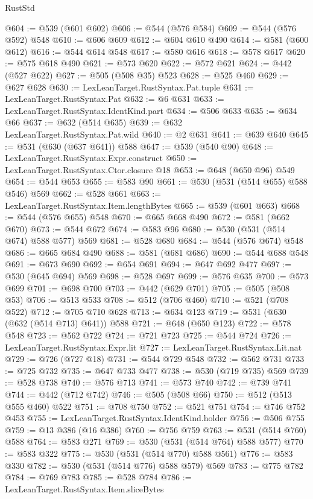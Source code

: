 \begin{lexlean}{RustStd}
\begin{coremodule}
@604 := @539 (@601 @602)
@606 := @544 (@576 @584)
@609 := @544 (@576 @592) @548
@610 := @606 @609
@612 := @604 @610 @490
@614 := @581 (@600 @612)
@616 := @544 @614 @548
@617 := @580 @616
@618 := @578 @617
@620 := @575 @618 @490
@621 := @573 @620
@622 := @572 @621
@624 := @442 (@527 @622)
@627 := @505 (@508 @35) @523
@628 := @525 @460
@629 := @627 @628
@630 := LexLeanTarget.RustSyntax.Pat.tuple
@631 := LexLeanTarget.RustSyntax.Pat
@632 := @6 @631
@633 := LexLeanTarget.RustSyntax.IdentKind.part
@634 := @506 @633
@635 := @634 @66
@637 := @632 (@514 @635)
@639 := @632 LexLeanTarget.RustSyntax.Pat.wild
@640 := @2 @631
@641 := @639 @640
@645 := @531 (@630 (@637 @641)) @588
@647 := @539 (@540 @90)
@648 := LexLeanTarget.RustSyntax.Expr.construct
@650 := LexLeanTarget.RustSyntax.Ctor.closure @18
@653 := @648 (@650 @96) @549
@654 := @544 @653
@655 := @583 @90
@661 := @530 (@531 (@514 @655) @588 @546) @569
@662 := @528 @661
@663 := LexLeanTarget.RustSyntax.Item.lengthBytes
@665 := @539 (@601 @663)
@668 := @544 (@576 @655) @548
@670 := @665 @668 @490
@672 := @581 (@662 @670)
@673 := @544 @672
@674 := @583 @96
@680 := @530 (@531 (@514 @674) @588 @577) @569
@681 := @528 @680
@684 := @544 (@576 @674) @548
@686 := @665 @684 @490
@688 := @581 (@681 @686)
@690 := @544 @688 @548
@691 := @673 @690
@692 := @654 @691
@694 := @647 @692 @477
@697 := @530 (@645 @694) @569
@698 := @528 @697
@699 := @576 @635
@700 := @573 @699
@701 := @698 @700
@703 := @442 (@629 @701)
@705 := @505 (@508 @53)
@706 := @513 @533
@708 := @512 (@706 @460)
@710 := @521 (@708 @522)
@712 := @705 @710 @628
@713 := @634 @123
@719 := @531 (@630 (@632 (@514 @713) @641)) @588
@721 := @648 (@650 @123)
@722 := @578 @548
@723 := @562 @722
@724 := @721 @723
@725 := @544 @724
@726 := LexLeanTarget.RustSyntax.Expr.lit
@727 := LexLeanTarget.RustSyntax.Lit.nat
@729 := @726 (@727 @18)
@731 := @544 @729 @548
@732 := @562 @731
@733 := @725 @732
@735 := @647 @733 @477
@738 := @530 (@719 @735) @569
@739 := @528 @738
@740 := @576 @713
@741 := @573 @740
@742 := @739 @741
@744 := @442 (@712 @742)
@746 := @505 (@508 @66)
@750 := @512 (@513 @555 @460) @522
@751 := @708 @750
@752 := @521 @751
@754 := @746 @752 @453
@755 := LexLeanTarget.RustSyntax.IdentKind.holder
@756 := @506 @755
@759 := @13 @386 (@16 @386)
@760 := @756 @759
@763 := @531 (@514 @760) @588
@764 := @583 @271
@769 := @530 (@531 (@514 @764) @588 @577)
@770 := @583 @322
@775 := @530 (@531 (@514 @770) @588 @561)
@776 := @583 @330
@782 := @530 (@531 (@514 @776) @588 @579) @569
@783 := @775 @782
@784 := @769 @783
@785 := @528 @784
@786 := LexLeanTarget.RustSyntax.Item.sliceBytes

\end{coremodule}
\end{lexlean}
